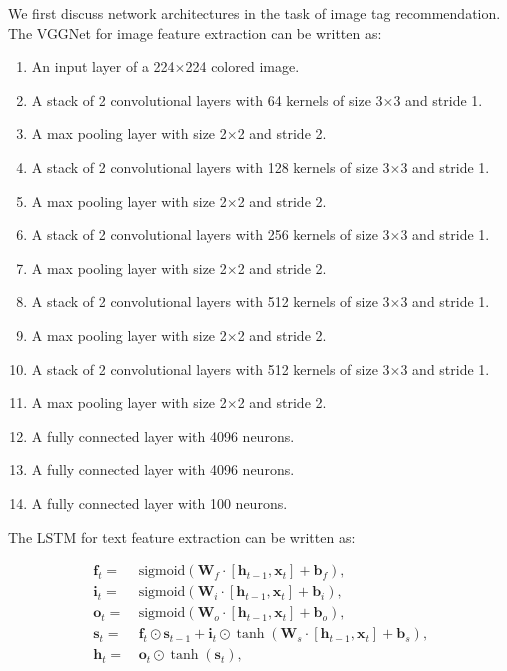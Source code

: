 \documentclass{article}
\newcommand{\OVEC}[1]{\bm{#1}} %
\newcommand{\MAT}[1]{\mathbf{#1}} %
\begin{document}
We first discuss network architectures in the task of image tag recommendation.
The VGGNet for image feature extraction can be written as:
\begin{enumerate}
\item An input layer of a 224$\times$224 colored image.
\item A stack of 2 convolutional layers with 64 kernels of size 3$\times$3 and stride 1.
\item A max pooling layer with size 2$\times$2 and stride 2.
\item A stack of 2 convolutional layers with 128 kernels of size 3$\times$3 and stride 1.
\item A max pooling layer with size 2$\times$2 and stride 2.
\item A stack of 2 convolutional layers with 256 kernels of size 3$\times$3 and stride 1.
\item A max pooling layer with size 2$\times$2 and stride 2.
\item A stack of 2 convolutional layers with 512 kernels of size 3$\times$3 and stride 1.
\item A max pooling layer with size 2$\times$2 and stride 2.
\item A stack of 2 convolutional layers with 512 kernels of size 3$\times$3 and stride 1.
\item A max pooling layer with size 2$\times$2 and stride 2.
\item A fully connected layer with 4096 neurons.
\item A fully connected layer with 4096 neurons.
\item A fully connected layer with 100 neurons.
\end{enumerate}
The LSTM for text feature extraction can be written as:
\begin{small}
\begin{equation*}
\begin{aligned}
\OVEC{f}_{t}=&\,\text{sigmoid}(\MAT{W}_{f}\cdot[\OVEC{h}_{t-1},\OVEC{x}_{t}]+\OVEC{b}_{f})\text{,}\\
\OVEC{i}_{t}=&\,\text{sigmoid}(\MAT{W}_{i}\cdot[\OVEC{h}_{t-1},\OVEC{x}_{t}]+\OVEC{b}_{i})\text{,}\\
\OVEC{o}_{t}=&\,\text{sigmoid}(\MAT{W}_{o}\cdot[\OVEC{h}_{t-1},\OVEC{x}_{t}]+\OVEC{b}_{o})\text{,}\\
\OVEC{s}_{t}=&\,\OVEC{f}_{t}\odot\OVEC{s}_{t-1}+
\OVEC{i}_{t}\odot\tanh(\MAT{W}_{s}\cdot[\OVEC{h}_{t-1},\OVEC{x}_{t}]+\OVEC{b}_{s})\text{,}\\
\OVEC{h}_{t}=&\,\OVEC{o}_{t}\odot\tanh(\OVEC{s}_{t})\text{,}
\end{aligned}
\end{equation*}
\end{small}%
\end{document}
